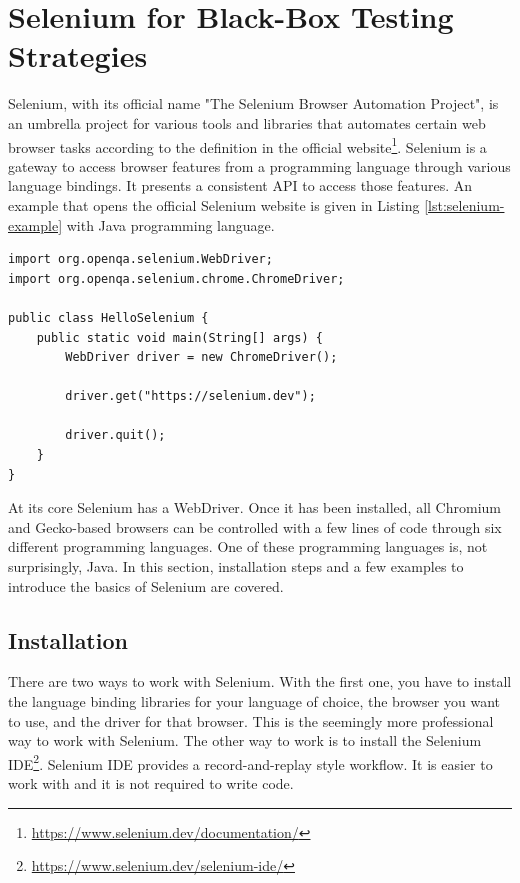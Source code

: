 \chapter{Selenium for Black-Box Testing Strategies}
Selenium, with its official name "The Selenium Browser Automation Project", is an umbrella project for various tools and libraries that automates certain web browser tasks according to the definition in the official website\footnote{\url{https://www.selenium.dev/documentation/}}. Selenium is a gateway to access browser features from a programming language through various language bindings. It presents a consistent API to access those features. An example that opens the official Selenium website is given in Listing \ref{lst:selenium-example} with Java programming language.

\begin{lstlisting}[caption={A Java program that opens the official Selenium website through a Chrome-based browser.}, label=lst:selenium-example]
import org.openqa.selenium.WebDriver;
import org.openqa.selenium.chrome.ChromeDriver;

public class HelloSelenium {
    public static void main(String[] args) {
        WebDriver driver = new ChromeDriver();

        driver.get("https://selenium.dev");

        driver.quit();
    }
}
\end{lstlisting}

At its core Selenium has a WebDriver. Once it has been installed, all Chromium and Gecko-based browsers can be controlled with a few lines of code through six different programming languages. One of these programming languages is, not surprisingly, Java. In this section, installation steps and a few examples to introduce the basics of Selenium are covered.

\section{Installation}
There are two ways to work with Selenium. With the first one, you have to install the language binding libraries for your language of choice, the browser you want to use, and the driver for that browser. This is the seemingly more professional way to work with Selenium. The other way to work is to install the Selenium IDE\footnote{\url{https://www.selenium.dev/selenium-ide/}}. Selenium IDE provides a record-and-replay style workflow. It is easier to work with and it is not required to write code.

